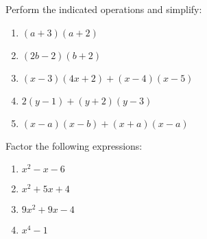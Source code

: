 \documentclass{exam}
\begin{document}
\begin{questions}

\question Perform the indicated operations and simplify:

\begin{enumerate}
	\item $(a + 3)(a + 2)$ \vspace{1.5 cm}
	
	\item $(2 b - 2)(b + 2)$ \vspace{1.5 cm}
	
	\item $(x - 3)(4 x + 2) + (x-4)(x - 5)$ \vspace{1.5 cm}
	
	\item $2(y - 1) + (y + 2)(y - 3)$ \vspace{1.5 cm}
	
	\item $(x - a)(x - b) + (x + a)(x-a)$
\end{enumerate}


\question Factor the following expressions:

\begin{enumerate}
	\item $x^{2} - x - 6$ \vspace{1.5 cm}

	\item $x^{2} + 5x + 4$ \vspace{1.5 cm}
	
	\item $9 x^{2} + 9 x - 4$ \vspace{1.5 cm}
	
	\item $x^{4} - 1$
\end{enumerate}


\end{questions}
\end{document}
